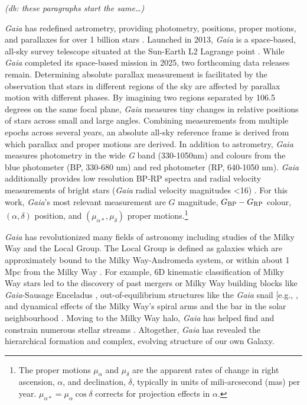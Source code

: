 \emph{(db: these paragraphs start the same\ldots)}

\emph{Gaia} has redefined astrometry, providing photometry, positions,
proper motions, and parallaxes for over 1 billion stars
\citep{gaiacollaboration+2021}. Launched in 2013, \emph{Gaia} is a
space-based, all-sky survey telescope situated at the Sun-Earth L2
Lagrange point \citep{gaiacollaboration+2016}. While \emph{Gaia}
completed its space-based mission in 2025, two forthcoming data releases
remain. Determining absolute parallax measurement is facilitated by the
observation that stars in different regions of the sky are affected by
parallax motion with different phases. By imagining two regions
separated by 106.5 degrees on the same focal plane, \emph{Gaia} measures
tiny changes in relative positions of stars across small and large
angles. Combining measurements from multiple epochs across several
years, an absolute all-sky reference frame is derived from which
parallax and proper motions are derived. In addition to astrometry,
\emph{Gaia} measures photometry in the wide \emph{G} band (330-1050nm)
and colours from the blue photometer (BP, 330-680 nm) and red photometer
(RP, 640-1050 nm). \emph{Gaia} additionally provides low resolution
BP-RP spectra and radial velocity measurements of bright stars
(\emph{Gaia} radial velocity magnitudes \textless16)
\citep{gaiacollaboration+2016}. For this work, \emph{Gaia}'s most
relevant measurement are \(G\) magnitude, \(G_{\rm BP} - G_{\rm RP}\)
colour, \((\alpha, \delta)\) position, and
\((\mu_{\alpha*}, \mu_\delta)\) proper motions.\footnote{The proper
  motions \(\mu_\alpha\) and \(\mu_\delta\) are the apparent rates of
  change in right ascension, \(\alpha\), and declination, \(\delta\),
  typically in units of mili-arcsecond (mas) per year.
  \(\mu_{\alpha*} = \mu_\alpha \cos \delta\) corrects for projection
  effects in \(\alpha\).}

\emph{Gaia} has revolutionized many fields of astronomy including
studies of the Milky Way and the Local Group. The Local Group is defined
as galaxies which are approximately bound to the Milky Way-Andromeda
system, or within about 1 Mpc from the Milky Way \citep[e.g.,][ and
references therein]{mcconnachie2012}. For example, 6D kinematic
classification of Milky Way stars led to the discovery of past mergers
or Milky Way building blocks like \emph{Gaia}-Sausage Enceladus
\citep[e.g.,][]{helmi+2018}, out-of-equilibrium structures like the
\emph{Gaia} snail {[}e.g., \citet{antoja+2018}, and dynamical effects of
the Milky Way's spiral arms and the bar in the solar neighbourhood
\citep{hunt+vasiliev2025}. Moving to the Milky Way halo, \emph{Gaia} has
helped find and constrain numerous stellar streams
\citep{bonaca+price-whelan2025}. Altogether, \emph{Gaia} has revealed
the hierarchical formation and complex, evolving structure of our own
Galaxy.


